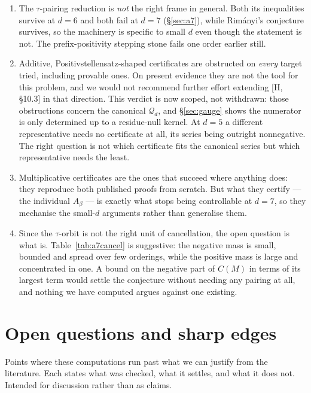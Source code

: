 \documentclass[11pt,a4paper]{article}
\newcommand{\Qd}{\mathcal{Q}}
\theoremstyle{plain}
\theoremstyle{definition}
\theoremstyle{remark}
\begin{document}
\begin{enumerate}[itemsep=3pt,topsep=3pt]
\item The $\tau$-pairing reduction is \emph{not} the right frame in general.  Both its
  inequalities survive at $d = 6$ and both fail at $d = 7$ (\S\ref{sec:a7}), while Rim\'anyi's
  conjecture survives, so the machinery is specific to small $d$ even though the statement is not.
  The prefix-positivity stepping stone fails one order earlier still.
\item Additive, Positivstellensatz-shaped certificates are obstructed on \emph{every} target
  tried, including provable ones. On present evidence they are not the tool for this problem,
  and we would not recommend further effort extending [H, \S10.3] in that direction.
  This verdict is now scoped, not withdrawn: those obstructions concern the canonical
  $\Qd_d$, and \S\ref{sec:gauge} shows the numerator is only determined up to a residue-null
  kernel. At $d = 5$ a different representative needs no certificate at all, its series being
  outright nonnegative. The right question is not which certificate fits the canonical series
  but which representative needs the least.
\item Multiplicative certificates are the ones that succeed where anything does: they reproduce
  both published proofs from scratch.  But what they certify --- the individual $A_\beta$ --- is
  exactly what stops being controllable at $d = 7$, so they mechanise the small-$d$ arguments
  rather than generalise them.
\item Since the $\tau$-orbit is not the right unit of cancellation, the open question is what is.
  Table~\ref{tab:a7cancel} is suggestive: the negative mass is small, bounded and spread over few
  orderings, while the positive mass is large and concentrated in one.  A bound on the negative
  part of $C(M)$ in terms of its largest term would settle the conjecture without needing any
  pairing at all, and nothing we have computed argues against one existing.
\end{enumerate}

\section{Open questions and sharp edges}
\label{sec:open}

Points where these computations run past what we can justify from the literature. Each states what
was checked, what it settles, and what it does not. Intended for discussion rather than as claims.
\end{document}
